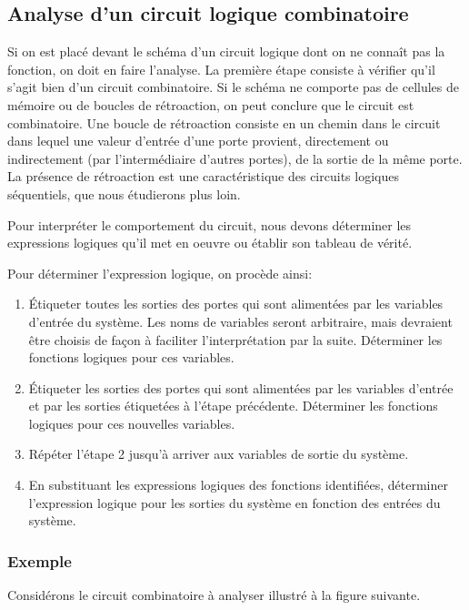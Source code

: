\documentclass[11pt]{article}
\begin{document}
\subsection{Analyse d'un circuit logique combinatoire}
\label{sec:org138fc1b}

Si on est placé devant le schéma d'un circuit logique dont on ne
connaît pas la fonction, on doit en faire l'analyse. La première étape
consiste à vérifier qu'il s'agit bien d'un circuit combinatoire. Si le
schéma ne comporte pas de cellules de mémoire ou de boucles de
rétroaction, on peut conclure que le circuit est combinatoire. Une
boucle de rétroaction consiste en un chemin dans le circuit dans
lequel une valeur d'entrée d'une porte provient, directement ou
indirectement (par l'intermédiaire d'autres portes), de la sortie de
la même porte. La présence de rétroaction est une caractéristique des
circuits logiques séquentiels, que nous étudierons plus loin.

Pour interpréter le comportement du circuit, nous devons déterminer
les expressions logiques qu'il met en oeuvre ou établir son tableau de
vérité.

Pour déterminer l'expression logique, on procède ainsi:
\begin{enumerate}
\item Étiqueter toutes les sorties des portes qui sont alimentées par les
variables d'entrée du système. Les noms de variables seront
arbitraire, mais devraient être choisis de façon à faciliter
l'interprétation par la suite. Déterminer les fonctions logiques
pour ces variables.
\item Étiqueter les sorties des portes qui sont alimentées par les
variables d'entrée et par les sorties étiquetées à l'étape
précédente. Déterminer les fonctions logiques pour ces nouvelles
variables.
\item Répéter l'étape 2 jusqu'à arriver aux variables de sortie du système.
\item En substituant les expressions logiques des fonctions identifiées,
déterminer l'expression logique pour les sorties du système en
fonction des entrées du système.
\end{enumerate}

\subsubsection{Exemple}
\label{sec:org61e1c23}

Considérons le circuit combinatoire à analyser illustré à la figure
suivante.
\end{document}
